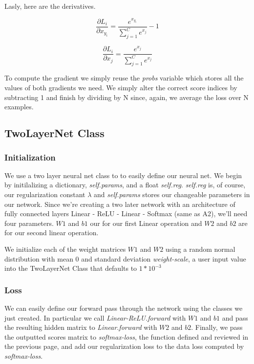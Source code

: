 \documentclass[12pt]{article}
\begin{document}
Lasly, here are the derivatives. 

\begin{equation}
    \frac{\partial L_{i}}{\partial x_{y_i}} = \frac{e^{x_{y_i}}}
    {\sum_{j=1}^C e^{x_{j}}} - 1
\end{equation}

\begin{equation}
    \frac{\partial L_{i}}{\partial x_j} = \frac{e^{x_{j}}}
    {\sum_{j=1}^C e^{x_j}}
\end{equation}

To compute the gradient we simply reuse the \emph{probs} variable which stores
all the values of both gradients we need. We simply alter the correct score
indices by subtracting 1 and finish by dividing by N since, again, we average the loss 
over N examples. 

\subsection{TwoLayerNet Class}

\subsubsection{Initialization}
We use a two layer neural net class to to easily define our neural net. We begin by initilalizing
a dictionary, \emph{self.params}, and a float \emph{self.reg}. \emph{self.reg} is, of course, 
our regularization constant $\lambda$ and \emph{self.params} stores our changeable parameters 
in our network. Since we're creating a two later network with an architecture of fully connected
layers Linear - ReLU - Linear - Softmax (same as A2), we'll need four parameters. $W1$ and $b1$ our 
for our first Linear operation and $W2$ and $b2$ are for our second linear operation. 

We initialize each of the weight matrices $W1$ and $W2$ using a random normal distribution 
with mean 0 and standard deviation \emph{weight-scale}, a user input value into the TwoLayerNet Class
that defaults to $1*10^{-3}$

\subsubsection{Loss}
We can easily define our forward pass through the network using the classes we just created. 
In particular we call \emph{Linear-ReLU.forward} with $W1$ and $b1$ and pass the resulting 
hidden matrix to \emph{Linear.forward} with $W2$ and $b2$. Finally, we pass the outputted scores
matrix to \emph{softmax-loss}, the function defined and reviewed in the previous page, and add 
our regularization loss to the data loss computed by \emph{softmax-loss}. 
\end{document}
